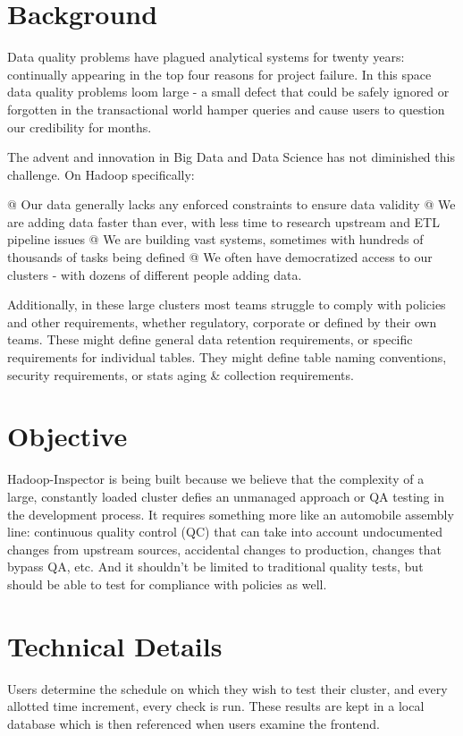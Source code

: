 \begin{abstract}
\end{abstract}

\section{Background}
Data quality problems have plagued analytical systems for twenty years: continually appearing in the top four reasons
for project failure. In this space data quality problems loom large - a small defect that could be safely ignored or
forgotten in the transactional world hamper queries and cause users to question our credibility for months.

The advent and innovation in Big Data and Data Science has not diminished this challenge. On Hadoop specifically:

\begin{easylist}[itemize]
    @ Our data generally lacks any enforced constraints to ensure data validity
    @ We are adding data faster than ever, with less time to research upstream and ETL pipeline issues
    @ We are building vast systems, sometimes with hundreds of thousands of tasks being defined
    @ We often have democratized access to our clusters - with dozens of different people adding data.
\end{easylist}

Additionally, in these large clusters most teams struggle to comply with policies and other requirements, whether
regulatory, corporate or defined by their own teams. These might define general data retention requirements, or specific
requirements for individual tables. They might define table naming conventions, security requirements, or stats aging \&
collection requirements.


\section{Objective}
Hadoop-Inspector is being built because we believe that the complexity of a large, constantly loaded cluster defies an
unmanaged approach or QA testing in the development process. It requires something more like an automobile assembly
line: continuous quality control (QC) that can take into account undocumented changes from upstream sources, accidental
changes to production, changes that bypass QA, etc. And it shouldn't be limited to traditional quality tests, but should
be able to test for compliance with policies as well.


\section{Technical Details}
Users determine the schedule on which they wish to test their cluster, and every allotted time increment, every check
is run. These results are kept in a local database which is then referenced when users examine the frontend.

